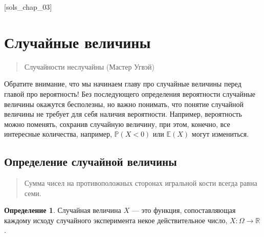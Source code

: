 \documentclass[pdftex, 12pt, a4paper]{article}
\def \mbb{\mathbb}
\def \PP{\mbb{P}}
\newcommand{\E}{\mathbb{E}}
\def\R{\ensuremath{\mathbb{R}}} %
\renewcommand{\to}{\rightarrow}
\theoremstyle{definition} %
\newtheorem*{mydef}{Определение}
\numberwithin{problem}{section}
\numberwithin{blits}{section}
\begin{document}
[sols_chap_03]


\section{Случайные величины}
\begin{quote}
Случайности неслучайны (Мастер Угвэй)
\end{quote}

Обратите внимание, что мы начинаем главу про случайные величины перед главой про вероятность! Без последующего определения вероятности случайные величины окажутся бесполезны, но важно понимать, что понятие случайной величины не требует для себя наличия вероятности. Например, вероятность можно поменять, сохранив случайную величину, при этом, конечно, все интересные количества, например, $\PP(X<0)$ или $\E(X)$ могут измениться.

\subsection{Определение случайной величины}

\begin{quote}
Сумма чисел на противоположных сторонах игральной кости всегда равна семи.
\end{quote}

\begin{mydef}
Случайная величина $X$ --- это функция, сопоставляющая каждому исходу случайного эксперимента некое действительное число, $ X \colon \Omega\to\R $.
\end{mydef}
\end{document}
